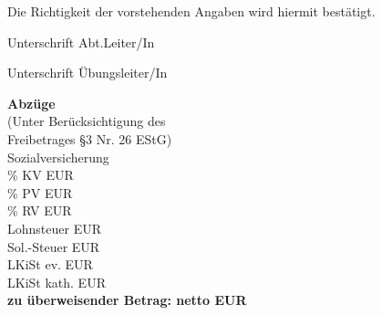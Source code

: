 \documentclass[a4paper,10pt,BCOR=0mm]{scrreprt}
\begin{document}
\vfill
Die Richtigkeit der vorstehenden Angaben wird hiermit bestätigt.\\
\begin{center}
\parbox{6cm}{
\vspace{9mm}
\begin{center}
Unterschrift Abt.Leiter/In
\end{center}
\vspace{9mm}
\begin{center}
Unterschrift Übungsleiter/In
\end{center}
}
\hfill
\parbox{0.45\textwidth }{
\begin{small}\textbf{Abzüge}\hfill \hspace*{2cm}\\
(Unter Berücksichtigung des\hfill \hspace*{2cm}\\
Freibetrages \S 3 Nr. 26 EStG)\hfill \hspace*{2cm}\\
\hspace*{2cm} Sozialversicherung \hfill \hspace*{2cm}\\
\hspace*{2cm} \% KV \hfill  EUR \hspace*{2cm} \\
\hspace*{2cm} \% PV \hfill  EUR \hspace*{2cm} \\
\hspace*{2cm} \% RV \hfill  EUR \hspace*{2cm} \\
Lohnsteuer  \hfill \hfill EUR \hspace*{2cm} \\
Sol.-Steuer  \hfill \hfill EUR \hspace*{2cm} \\
LKiSt ev. \hfill \hfill EUR \hspace*{2cm} \\
LKiSt kath. \hfill \hfill EUR \hspace*{2cm} \\
\hfill*\textbf{zu überweisender Betrag: netto EUR} \hspace*{2cm}\\
\end{small}}
\end{center}
\end{document}
